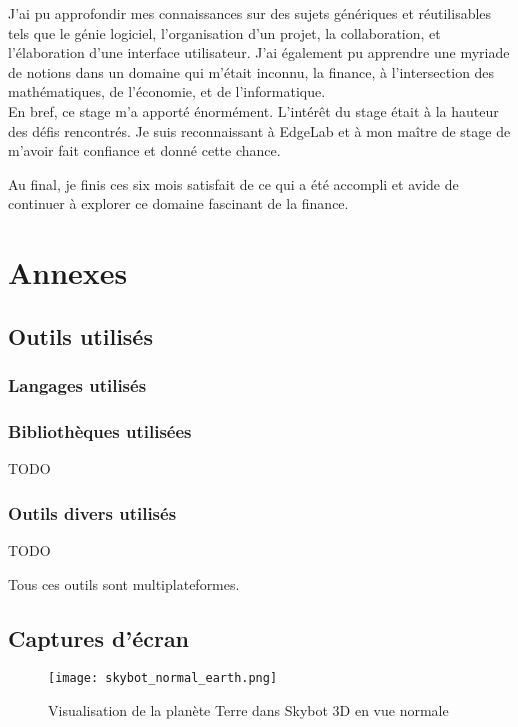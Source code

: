 \documentclass[a4paper,french,12pt]{article}
\begin{document}
	J'ai pu approfondir mes connaissances sur des sujets génériques et réutilisables tels que le génie logiciel, l'organisation d'un projet, la collaboration, et l'élaboration d'une interface utilisateur. J'ai également pu apprendre une myriade de notions dans un domaine qui m'était inconnu, la finance, à l'intersection des mathématiques, de l'économie, et de l'informatique.~\\
	
	En bref, ce stage m'a apporté énormément. L'intérêt du stage était à la hauteur des défis rencontrés.
	Je suis reconnaissant à EdgeLab et à mon maître de stage de m'avoir fait confiance et donné cette chance.

	Au final, je finis ces six mois satisfait de ce qui a été accompli et avide de continuer à explorer ce domaine fascinant de la finance.
	\newpage
\section{Annexes}

	\subsection{Outils utilisés}

		\subsubsection{Langages utilisés}

		\subsubsection{Bibliothèques utilisées}

		  \begin{description}
		  	\item TODO
		  \end{description}



		\subsubsection{Outils divers utilisés}
		  \begin{description}
		  		  	\item TODO
		  \end{description}

		Tous ces outils sont multiplateformes.

	\subsection{Captures d'écran}
		\FloatBarrier
		\newpage
		\begin{figure}
			      \centering
			      \texttt{[image: skybot\_normal\_earth.png]}
			      \caption{Visualisation de la planète Terre dans Skybot 3D en vue normale}
		\end{figure}
\end{document}
